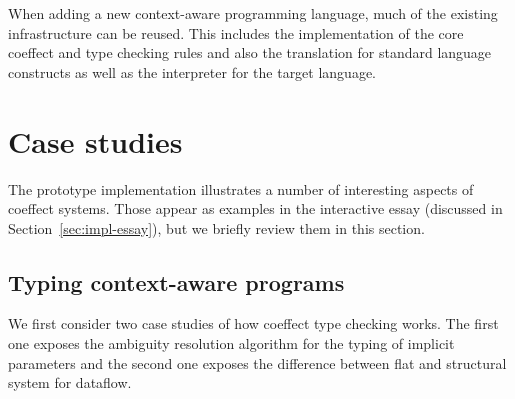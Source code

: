 When adding a new context-aware programming language, much of the existing infrastructure
can be reused. This includes the implementation of the core coeffect and type checking rules and
also the translation for standard language constructs as well as the interpreter for the target
language.


%
%

\section{Case studies}
\label{sec:impl-case}

The prototype implementation illustrates a number of interesting aspects of coeffect systems.
Those appear as examples in the interactive essay (discussed in Section~\ref{sec:impl-essay}),
but we briefly review them in this section.


\subsection{Typing context-aware programs}
\label{sec:impl-case-typing}

We first consider two case studies of how coeffect type checking works. The first one exposes the
ambiguity resolution algorithm for the typing of implicit parameters and the second one exposes the
difference between flat and structural system for dataflow.

\vspace{-0.5em}

